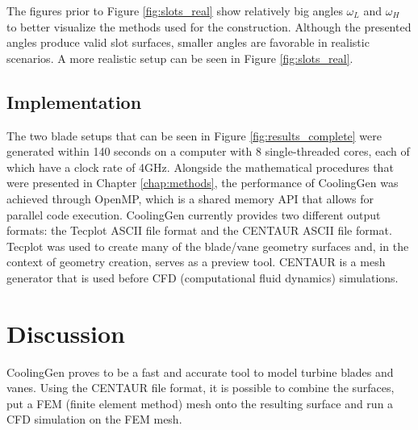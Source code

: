 \documentclass[a4paper, 11pt]{report}
\theoremstyle{definition}
\begin{document}
	The figures prior to Figure \ref{fig:slots_real} show relatively big angles $\omega_L$ and $\omega_H$ to better visualize the methods used for the construction. Although the presented angles produce valid slot surfaces, smaller angles are favorable in realistic scenarios. A more realistic setup can be seen in Figure \ref{fig:slots_real}.

\section{Implementation}\label{sec:implementation}
	The two blade setups that can be seen in Figure \ref{fig:results_complete} were generated within 140 seconds on a computer with 8 single-threaded cores, each of which have a clock rate of 4GHz. Alongside the mathematical procedures that were presented in Chapter \ref{chap:methods}, the performance of CoolingGen was achieved through OpenMP, which is a shared memory API that allows for parallel code execution. CoolingGen currently provides two different output formats: the Tecplot \cite{TecplotSoft} ASCII file format and the CENTAUR \cite{CENTAURSoft} ASCII file format. Tecplot was used to create many of the blade/vane geometry surfaces and, in the context of geometry creation, serves as a preview tool. CENTAUR is a mesh generator that is used before CFD (computational fluid dynamics) simulations.

\chapter{Discussion}
	CoolingGen proves to be a fast and accurate tool to model turbine blades and vanes. Using the CENTAUR file format, it is possible to combine the surfaces, put a FEM (finite element method) mesh onto the resulting surface and run a CFD  simulation on the FEM mesh.
\end{document}
